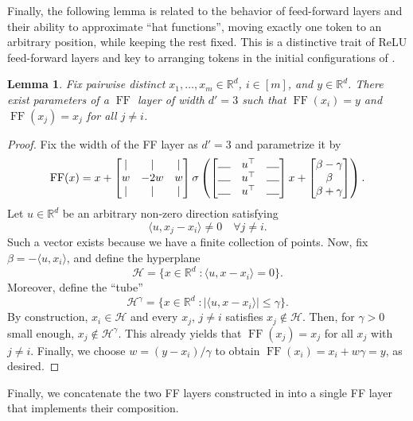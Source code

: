 \documentclass[pdflatex,sn-mathphys-num]{sn-jnl}%
\theoremstyle{thmstyleone}%
\newtheorem{lemma}[theorem]{Lemma}
\theoremstyle{thmstyletwo}%
\theoremstyle{thmstylethree}%
\numberwithin{equation}{section}
\newcommand{\R}{\mathbb{R}}
\DeclareMathOperator{\FF}{\mathrm{FF}}
\newcommand{\ip}[2]{\langle #1, #2 \rangle}
\begin{document}
%
Finally, the following lemma is related to the behavior of feed-forward layers and their ability to approximate ``hat functions'', moving exactly one token to an arbitrary position, while keeping the rest fixed. This is a distinctive trait of ReLU feed-forward layers and key to arranging tokens in the initial configurations of . 

\begin{lemma}\label{lem:hatFFClassifier}
    Fix pairwise distinct $x_1, \dots, x_m \in \R^d$, $i\in [m]$, and $y\in \R^d$. There exist parameters of a $\FF$ layer of width $d' = 3$ such that $\FF(x_i) = y$ and $\FF(x_j) = x_j$ for all $j\neq i$.
\end{lemma}
\begin{proof}
Fix the width of the FF layer as $d' = 3$ and parametrize it by
\begin{equation*}
\mathrm{FF}(x) = x + \begin{bmatrix}
\vert & \vert & \vert \\
{w} & -2{w} & {w} \\
\vert & \vert & \vert
\end{bmatrix} \sigma\left( \begin{bmatrix}
\rule{0.4cm}{0.4pt} & {u^\top} & \rule{0.4cm}{0.4pt} \\
\rule{0.4cm}{0.4pt} & {u^\top} & \rule{0.4cm}{0.4pt} \\
\rule{0.4cm}{0.4pt} & {u^\top} & \rule{0.4cm}{0.4pt}
\end{bmatrix} x + \begin{bmatrix}
    {\beta} - {\gamma} \\
    {\beta} \\
    {\beta} + {\gamma}
\end{bmatrix}\right).
\end{equation*}
Let $u\in \R^d$ be an arbitrary non-zero direction satisfying
\begin{equation*}
     \ip{u}{x_j - x_i} \neq 0 \quad \forall j\neq i.
\end{equation*}
Such a vector exists because we have a finite collection of points. Now, fix $\beta = - \ip{u}{x_i}$, and define the hyperplane
\begin{equation*}
    \mathcal{H} = \{ x \in \R^d \; : \ip{u}{x - x_i} = 0 \}.
\end{equation*}
Moreover, define the ``tube''
\begin{equation*}
    \mathcal{H}^{\gamma} = \{ x \in \R^d \; : |\ip{u}{x - x_i}| \leq \gamma \}.
\end{equation*}
By construction, $x_i \in \mathcal{H}$ and every $x_j$, $j\neq i$ satisfies $x_j\notin \mathcal{H}$. Then, for $\gamma > 0$ small enough, $x_j \notin \mathcal{H}^\gamma$. This already yields that $\FF (x_j) = x_j$ for all $x_j$ with $j\neq i$. Finally, we choose $w = (y - x_i) / \gamma$ to obtain $\FF (x_i) = x_i + w \gamma = y$, as desired.
\end{proof}
%
Finally, we concatenate the two FF layers constructed in  into a single FF layer that implements their composition.
\end{document}
